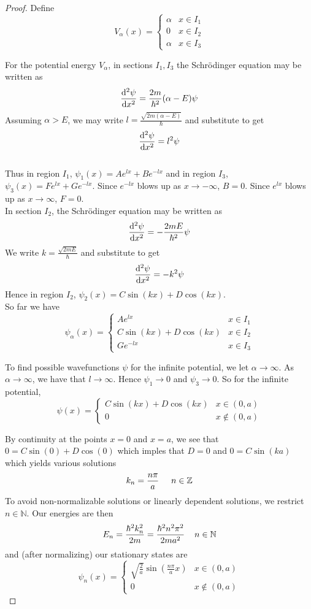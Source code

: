 \documentclass[12pt]{amsart}
\newcommand{\sch}{Schr\"{o}dinger }
\newcommand{\al}{\alpha}
\newcommand{\N}{\mathbb{N}}
\newcommand{\Z}{\mathbb{Z}}
\begin{document}
\begin{proof}
Define 
\[
V_\al(x) = 
\begin{cases}
\al & x \in I_1 \\
0 & x \in I_2\\
\al & x \in I_3
\end{cases}
\]

For the potential energy $V_\al$, in sections $I_1, I_3$ the \sch equation may be written as $$\dv[2]{\psi}{x} = \frac{2m}{\hbar^2}(\al-E)\psi$$ Assuming $\al > E$, we may write $l = \frac{\sqrt{2m(\al-E)}}{\hbar}$ and substitute to get $$\dv[2]{\psi}{x} = l^2\psi$$ \\Thus in region $I_1$, $\psi_1(x) = Ae^{lx} + Be^{-lx}$ and in region $I_3$, $\psi_3(x) = Fe^{lx} + Ge^{-lx}$. Since $e^{-lx}$ blows up as $x \rightarrow - \infty$, $B=0$. Since $e^{lx}$ blows up as $x \rightarrow  \infty$, $F=0$. \vspace{4mm}\\
In section $I_2$, the \sch equation may be written as $$\dv[2]{\psi}{x} = -\frac{2mE}{\hbar^2}\psi$$ We write $k = \frac{\sqrt{2mE}}{\hbar}$ and substitute to get $$\dv[2]{\psi}{x} = -k^2\psi$$  
Hence in region $I_2$, $\psi_2(x) = C\sin(kx) + D \cos(kx)$. \vspace{.4cm}\\
So far we have 
\[
\psi_\al(x)= 
\begin{cases}
Ae^{lx} & x \in I_1 \\
C\sin(kx) + D \cos(kx)  & x \in I_2 \\
Ge^{-lx} & x \in I_3
\end{cases}
\]

To find possible wavefunctions $\psi$ for the infinite potential, we let $\al \rightarrow \infty$. As $\al \rightarrow \infty$, we have that $l \rightarrow \infty$. Hence $\psi_1 \rightarrow 0$ and $\psi_3 \rightarrow 0$. So for the infinite potential, 
\[
\psi(x)= 
\begin{cases}
C\sin(kx) + D \cos(kx)  & x \in (0,a) \\
0 & x \not \in (0,a)
\end{cases}
\] 

By continuity at the points $x=0$ and $x=a$, we see that $0 = C\sin(0) + D \cos(0)$ which imples that $D= 0$ and $0 = C\sin(ka)$ which yields various solutions $$k_n = \frac{n \pi}{a} \hspace{.5cm} n \in \Z$$
To avoid non-normalizable solutions or linearly dependent solutions, we restrict $n \in \N$. Our energies are then $$E_n = \frac{\hbar^2k_n^2}{2m} = \frac{\hbar^2n^2 \pi^2}{2ma^2} \hspace{.4cm} n \in \N$$
and (after normalizing) our stationary states are 
\[
\psi_n(x)= 
\begin{cases}
\sqrt{\frac{2}{a}}\sin(\frac{n \pi}{a}x)  & x \in (0,a) \\
0 & x \not \in (0,a)
\end{cases}
\]
\end{proof}
\end{document}
